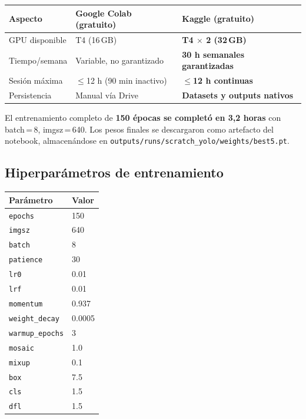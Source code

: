 \documentclass[12pt,a4paper]{article}
\begin{document}
\begin{center}
\begin{tabularx}{\linewidth}{lXX}
  \toprule
  \textbf{Aspecto} & \textbf{Google Colab (gratuito)} & \textbf{Kaggle (gratuito)} \\
  \midrule
  GPU disponible    & T4 (16\,GB)              & \textbf{T4 $\times$ 2 (32\,GB)} \\
  Tiempo/semana     & Variable, no garantizado & \textbf{30 h semanales garantizadas} \\
  Sesión máxima     & $\leq$12 h (90 min inactivo) & \textbf{$\leq$12 h continuas} \\
  Persistencia      & Manual vía Drive         & \textbf{Datasets y outputs nativos} \\
  \bottomrule
\end{tabularx}
\end{center}

El entrenamiento completo de \textbf{150 épocas se completó en 3,2 horas} con
batch\,=\,8, imgsz\,=\,640. Los pesos finales se descargaron como artefacto del
notebook, almacenándose en \texttt{outputs/runs/scratch\_yolo/weights/best5.pt}.

\subsection{Hiperparámetros de entrenamiento}

\begin{center}
\begin{tabular}{ll}
  \toprule
  \textbf{Parámetro} & \textbf{Valor} \\
  \midrule
  \texttt{epochs}         & 150    \\
  \texttt{imgsz}          & 640    \\
  \texttt{batch}          & 8      \\
  \texttt{patience}       & 30     \\
  \texttt{lr0}            & 0.01   \\
  \texttt{lrf}            & 0.01   \\
  \texttt{momentum}       & 0.937  \\
  \texttt{weight\_decay}  & 0.0005 \\
  \texttt{warmup\_epochs} & 3      \\
  \texttt{mosaic}         & 1.0    \\
  \texttt{mixup}          & 0.1    \\
  \texttt{box}            & 7.5    \\
  \texttt{cls}            & 1.5    \\
  \texttt{dfl}            & 1.5    \\
  \bottomrule
\end{tabular}
\end{center}
\end{document}

